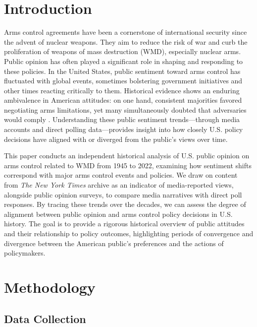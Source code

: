 \documentclass[11,5 pt]{article}
\begin{document}
\section{Introduction}

    Arms control agreements have been a cornerstone of international security since the advent of nuclear weapons. They aim to reduce the risk of war and curb the proliferation of weapons of mass destruction (WMD), especially nuclear arms. Public opinion has often played a significant role in shaping and responding to these policies. In the United States, public sentiment toward arms control has fluctuated with global events, sometimes bolstering government initiatives and other times reacting critically to them. Historical evidence shows an enduring ambivalence in American attitudes: on one hand, consistent majorities favored negotiating arms limitations, yet many simultaneously doubted that adversaries would comply \cite{ArmsControlColdWar}. Understanding these public sentiment trends—through media accounts and direct polling data—provides insight into how closely U.S. policy decisions have aligned with or diverged from the public’s views over time. 
    
    This paper conducts an independent historical analysis of U.S. public opinion on arms control related to WMD from 1945 to 2022, examining how sentiment shifts correspond with major arms control events and policies. We draw on content from \textit{The New York Times} archive as an indicator of media-reported views, alongside public opinion surveys, to compare media narratives with direct poll responses. By tracing these trends over the decades, we can assess the degree of alignment between public opinion and arms control policy decisions in U.S. history. The goal is to provide a rigorous historical overview of public attitudes and their relationship to policy outcomes, highlighting periods of convergence and divergence between the American public’s preferences and the actions of policymakers.


\section{Methodology}

\subsection{Data Collection}
\end{document}
